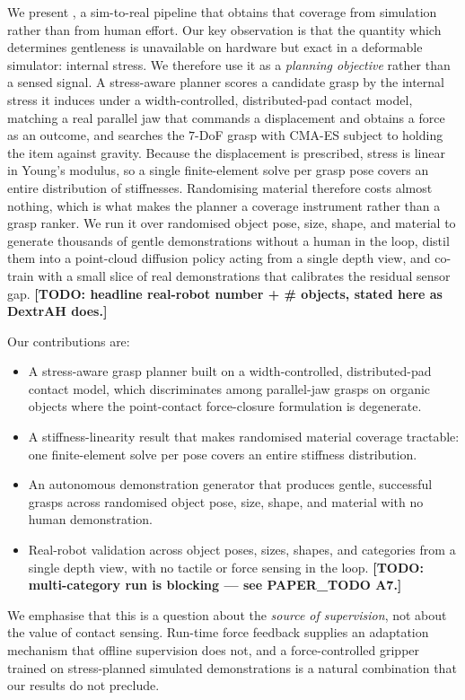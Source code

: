 We present \method, a sim-to-real pipeline that obtains that coverage from simulation rather
than from human effort. Our key observation is that the quantity which determines gentleness
is unavailable on hardware but exact in a deformable simulator: internal stress. We therefore
use it as a \emph{planning objective} rather than a sensed signal. A stress-aware planner
scores a candidate grasp by the internal stress it induces under a width-controlled,
distributed-pad contact model, matching a real parallel jaw that commands a displacement and
obtains a force as an outcome, and searches the $7$-DoF grasp with CMA-ES subject to holding
the item against gravity. Because the displacement is prescribed, stress is linear in Young's
modulus, so a single finite-element solve per grasp pose covers an entire distribution of
stiffnesses. Randomising material therefore costs almost nothing, which is what makes the
planner a coverage instrument rather than a grasp ranker. We run it over randomised object
pose, size, shape, and material to generate thousands of gentle demonstrations without a human
in the loop, distil them into a point-cloud diffusion policy acting from a single depth view,
and co-train with a small slice of real demonstrations that calibrates the residual sensor
gap. \textbf{[TODO: headline real-robot number + \# objects, stated here as DextrAH does.]}

\noindent Our contributions are:
\begin{itemize}
  \item A stress-aware grasp planner built on a width-controlled, distributed-pad contact
        model, which discriminates among parallel-jaw grasps on organic objects where the
        point-contact force-closure formulation is degenerate.
  \item A stiffness-linearity result that makes randomised material coverage tractable: one
        finite-element solve per pose covers an entire stiffness distribution.
  \item An autonomous demonstration generator that produces gentle, successful grasps across
        randomised object pose, size, shape, and material with no human demonstration.
  \item Real-robot validation across object poses, sizes, shapes, and categories from a single
        depth view, with no tactile or force sensing in the loop.
        \textbf{[TODO: multi-category run is blocking --- see PAPER\_TODO A7.]}
\end{itemize}

\noindent We emphasise that this is a question about the \emph{source of supervision}, not
about the value of contact sensing. Run-time force feedback supplies an adaptation mechanism
that offline supervision does not, and a force-controlled gripper trained on stress-planned
simulated demonstrations is a natural combination that our results do not preclude.
